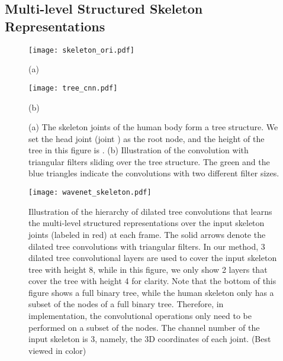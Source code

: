 \documentclass[10pt,twocolumn,letterpaper]{article}
\begin{document}
\subsection{Multi-level Structured Skeleton Representations}
\label{sec:method:treeCNN}

\begin{figure}[tp]
    \begin{minipage}[b]{0.45\linewidth}
		\centering
		\centerline{\texttt{[image: skeleton\_ori.pdf]}}
        (a)
	\end{minipage}
	\begin{minipage}[b]{0.549\linewidth}
		\centering
		\centerline{\texttt{[image: tree\_cnn.pdf]}}
         (b)
	\end{minipage}
\caption{
(a) The skeleton joints of the human body form a tree structure.
We set the head joint (joint ) as the root node,
and the height of the tree in this figure is .
(b) Illustration of the convolution with triangular filters sliding over the tree structure.
The green and the blue triangles indicate the convolutions with two different filter sizes.
}
	\label{fig:skeleton_tree_strucutre}
\end{figure}


\begin{figure}[tp]
	\centerline{\texttt{[image: wavenet\_skeleton.pdf]}}
	\caption{
Illustration of the hierarchy of dilated tree convolutions that learns the multi-level structured representations over the input skeleton joints (labeled in red) at each frame.
The solid arrows denote the dilated tree convolutions with triangular filters. In our method, 3 dilated tree convolutional layers are used to cover the input skeleton tree with height 8,
while in this figure, we only show 2 layers that cover the tree with height 4 for clarity.
Note that the bottom of this figure shows a full binary tree,
while the human skeleton only has a subset of the nodes of a full binary tree.
Therefore, in implementation, the convolutional operations only need to be performed on a subset of the nodes.
The channel number of the input skeleton is 3, namely, the 3D coordinates  of each joint.
(Best viewed in color)
}
	\label{fig:wavenetSkeleton}
\end{figure}
\end{document}
